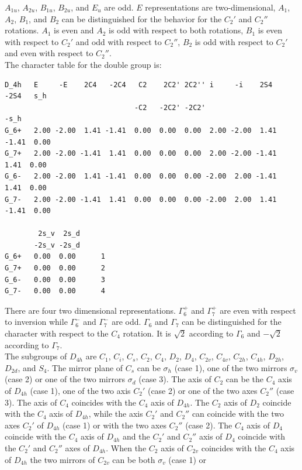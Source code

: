 \documentclass[12pt,a4paper]{article}
\begin{document}
$A_{1u}$, $A_{2u}$, $B_{1u}$, $B_{2u}$, and $E_u$ are odd.
$E$ representations are two-dimensional, $A_1$, $A_2$, $B_1$, and $B_2$ can
be distinguished for the behavior for the $C_2'$ and $C_2''$ rotations.
$A_1$ is even and $A_2$ is odd with respect to both rotations, 
$B_1$ is even with respect to $C_2'$ and odd with respect to $C_2''$,
$B_2$ is odd with respect to $C_2'$ and even with respect to $C_2''$. \\
The character table for the double group is:
\begin{verbatim}
D_4h   E     -E    2C4   -2C4   C2    2C2' 2C2'' i     -i    2S4   -2S4   s_h 
                               -C2   -2C2' -2C2'                         -s_h 
G_6+   2.00 -2.00  1.41 -1.41  0.00  0.00  0.00  2.00 -2.00  1.41 -1.41  0.00
G_7+   2.00 -2.00 -1.41  1.41  0.00  0.00  0.00  2.00 -2.00 -1.41  1.41  0.00
G_6-   2.00 -2.00  1.41 -1.41  0.00  0.00  0.00 -2.00  2.00 -1.41  1.41  0.00
G_7-   2.00 -2.00 -1.41  1.41  0.00  0.00  0.00 -2.00  2.00  1.41 -1.41  0.00

        2s_v  2s_d
       -2s_v -2s_d
G_6+   0.00  0.00      1
G_7+   0.00  0.00      2
G_6-   0.00  0.00      3
G_7-   0.00  0.00      4
\end{verbatim}
There are four two dimensional representations. $\Gamma_6^+$ and $\Gamma_7^+$
are even with respect to inversion while $\Gamma_6^-$ and $\Gamma_7^-$ are 
odd. $\Gamma_6$ and $\Gamma_7$ can be distinguished for the character with
respect to the $C_4$ rotation. It is $\sqrt{2}$ according to $\Gamma_6$ and
$-\sqrt{2}$ according to $\Gamma_7$. \\
The subgroups of $D_{4h}$ are $C_1$, $C_i$, $C_s$, $C_2$, $C_4$, $D_2$, $D_4$,
$C_{2v}$, $C_{4v}$, $C_{2h}$, $C_{4h}$, $D_{2h}$, $D_{2d}$, and $S_4$. 
The mirror plane of $C_s$ can be $\sigma_h$ (case 1), one of the two mirrors 
$\sigma_v$ (case 2) or one of the two mirrors $\sigma_d$ (case 3). 
The axis of $C_2$ can be the $C_4$ axis of $D_{4h}$ (case 1), 
one of the two axis $C_2'$ (case 2) or one of the two axes $C_2''$ (case 3). 
The axis of $C_4$ coincides with the $C_4$ axis of $D_{4h}$. 
The $C_2$ axis of $D_2$ coincide with the $C_4$ axis of $D_{4h}$, while
the axis $C_2'$ and $C_2''$ can coincide with the two axes $C_2'$ of
$D_{4h}$ (case 1) or with the two axes $C_2''$ (case 2).
The $C_4$ axis of $D_4$ coincide with the $C_4$ axis of $D_{4h}$ and
the $C_2'$ and $C_2''$ axis of $D_4$ coincide with the $C_2'$ and $C_2''$ axes
of $D_{4h}$.
When the $C_2$ axis of $C_{2v}$ coincides with the $C_4$ axis
of $D_{4h}$ the two mirrors of $C_{2v}$ can be both $\sigma_v$ (case 1) or 
\end{document}

